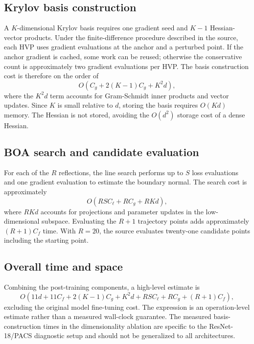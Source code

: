 \documentclass[11pt,a4paper]{article}
\begin{document}
\subsection{Krylov basis construction}
A $K$-dimensional Krylov basis requires one gradient seed and $K-1$ Hessian-vector products. Under the finite-difference procedure described in the source, each HVP uses gradient evaluations at the anchor and a perturbed point. If the anchor gradient is cached, some work can be reused; otherwise the conservative count is approximately two gradient evaluations per HVP. The basis construction cost is therefore on the order of
\begin{equation}
 O\!\left(C_g+2(K-1)C_g+K^2d\right),
\end{equation}
where the $K^2d$ term accounts for Gram-Schmidt inner products and vector updates. Since $K$ is small relative to $d$, storing the basis requires $O(Kd)$ memory. The Hessian is not stored, avoiding the $O(d^2)$ storage cost of a dense Hessian.

\subsection{BOA search and candidate evaluation}
For each of the $R$ reflections, the line search performs up to $S$ loss evaluations and one gradient evaluation to estimate the boundary normal. The search cost is approximately
\begin{equation}
 O\!\left(RS C_\ell+R C_g+R Kd\right),
\end{equation}
where $RKd$ accounts for projections and parameter updates in the low-dimensional subspace. Evaluating the $R+1$ trajectory points adds approximately $(R+1)C_f$ time. With $R=20$, the source evaluates twenty-one candidate points including the starting point.

\subsection{Overall time and space}
Combining the post-training components, a high-level estimate is
\begin{equation}
 O\!\left(11d+11C_f+2(K-1)C_g+K^2d
 +RS C_\ell+R C_g+(R+1)C_f\right),
 \label{eq:complexity}
\end{equation}
excluding the original model fine-tuning cost. The expression is an operation-level estimate rather than a measured wall-clock guarantee. The measured basis-construction times in the dimensionality ablation are specific to the ResNet-18/PACS diagnostic setup and should not be generalized to all architectures.
\end{document}
